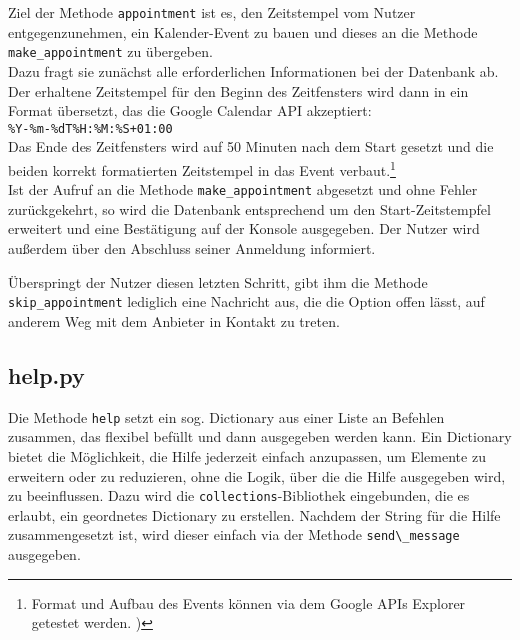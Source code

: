                 Ziel der Methode \verb|appointment| ist es, den Zeitstempel vom Nutzer entgegenzunehmen, ein Kalender-Event zu bauen und dieses an die Methode \verb|make_appointment| zu übergeben. \\
                Dazu fragt sie zunächst alle erforderlichen Informationen bei der Datenbank ab. Der erhaltene Zeitstempel für den Beginn des Zeitfensters wird dann in ein Format übersetzt, das die Google Calendar API akzeptiert: \\ 
                \verb/%Y-%m-%dT%H:%M:%S+01:00/ \\
                Das Ende des Zeitfensters wird auf 50 Minuten nach dem Start gesetzt und die beiden korrekt formatierten Zeitstempel in das Event verbaut.\footnote{Format und Aufbau des Events können via dem Google APIs Explorer getestet werden. \cite{apiExplorer})} \\
                Ist der Aufruf an die Methode \verb|make_appointment| abgesetzt und ohne Fehler zurückgekehrt, so wird die Datenbank entsprechend um den Start-Zeitstempfel erweitert und eine Bestätigung auf der Konsole ausgegeben. Der Nutzer wird außerdem über den Abschluss seiner Anmeldung informiert. 

                Überspringt der Nutzer diesen letzten Schritt, gibt ihm die Methode \verb|skip_appointment| lediglich eine Nachricht aus, die die Option offen lässt, auf anderem Weg mit dem Anbieter in Kontakt zu treten.

        
        \subsection{help.py} \label{Implementierung: help.py}
                Die Methode \verb|help| setzt ein sog. Dictionary aus einer Liste an Befehlen zusammen, das flexibel befüllt und dann ausgegeben werden kann. Ein Dictionary bietet die Möglichkeit, die Hilfe jederzeit einfach anzupassen, um Elemente zu erweitern oder zu reduzieren, ohne die Logik, über die die Hilfe ausgegeben wird, zu beeinflussen. Dazu wird die \verb|collections|-Bibliothek eingebunden, die es erlaubt, ein geordnetes Dictionary zu erstellen. Nachdem der String für die Hilfe zusammengesetzt ist, wird dieser einfach via der Methode \verb|send\_message| ausgegeben.


